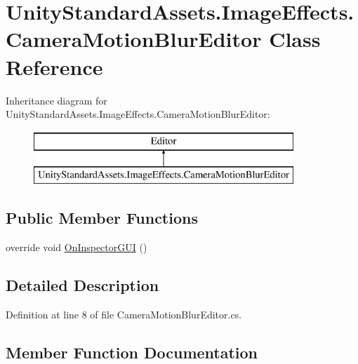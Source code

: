 \hypertarget{class_unity_standard_assets_1_1_image_effects_1_1_camera_motion_blur_editor}{}\section{Unity\+Standard\+Assets.\+Image\+Effects.\+Camera\+Motion\+Blur\+Editor Class Reference}
\label{class_unity_standard_assets_1_1_image_effects_1_1_camera_motion_blur_editor}
Inheritance diagram for Unity\+Standard\+Assets.\+Image\+Effects.\+Camera\+Motion\+Blur\+Editor\+:\begin{figure}[H]
\begin{center}
\leavevmode
\includegraphics[height=2.000000cm]{class_unity_standard_assets_1_1_image_effects_1_1_camera_motion_blur_editor}
\end{center}
\end{figure}
\subsection*{Public Member Functions}
\begin{DoxyCompactItemize}
\item 
override void \mbox{\hyperlink{class_unity_standard_assets_1_1_image_effects_1_1_camera_motion_blur_editor_ae2516983c2ffc4e6c69381d1b511e4e1}{On\+Inspector\+G\+UI}} ()
\end{DoxyCompactItemize}


\subsection{Detailed Description}


Definition at line 8 of file Camera\+Motion\+Blur\+Editor.\+cs.



\subsection{Member Function Documentation}
\mbox{\label{class_unity_standard_assets_1_1_image_effects_1_1_camera_motion_blur_editor_ae2516983c2ffc4e6c69381d1b511e4e1}} 
